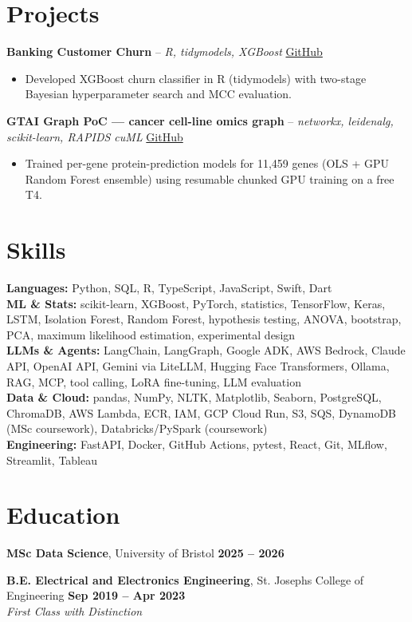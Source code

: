 \documentclass[a4paper,10pt]{article}
\begin{document}
\section{Projects}
\noindent\textbf{Banking Customer Churn} -- \textit{R, tidymodels, XGBoost} \hfill \href{https://github.com/Thiruvel-AP/Banking-Customer-Churn-Prediction}{GitHub}
\begin{itemize}
  \item Developed XGBoost churn classifier in R (tidymodels) with two-stage Bayesian hyperparameter search and MCC evaluation.
\end{itemize}
\noindent\textbf{GTAI Graph PoC — cancer cell-line omics graph} -- \textit{networkx, leidenalg, scikit-learn, RAPIDS cuML} \hfill \href{https://github.com/Thiruvel-AP/GTAI-GraphPOC}{GitHub}
\begin{itemize}
  \item Trained per-gene protein-prediction models for 11,459 genes (OLS + GPU Random Forest ensemble) using resumable chunked GPU training on a free T4.
\end{itemize}

\section{Skills}
\textbf{Languages:} Python, SQL, R, TypeScript, JavaScript, Swift, Dart\\
\textbf{ML \& Stats:} scikit-learn, XGBoost, PyTorch, statistics, TensorFlow, Keras, LSTM, Isolation Forest, Random Forest, hypothesis testing, ANOVA, bootstrap, PCA, maximum likelihood estimation, experimental design\\
\textbf{LLMs \& Agents:} LangChain, LangGraph, Google ADK, AWS Bedrock, Claude API, OpenAI API, Gemini via LiteLLM, Hugging Face Transformers, Ollama, RAG, MCP, tool calling, LoRA fine-tuning, LLM evaluation\\
\textbf{Data \& Cloud:} pandas, NumPy, NLTK, Matplotlib, Seaborn, PostgreSQL, ChromaDB, AWS Lambda, ECR, IAM, GCP Cloud Run, S3, SQS, DynamoDB (MSc coursework), Databricks/PySpark (coursework)\\
\textbf{Engineering:} FastAPI, Docker, GitHub Actions, pytest, React, Git, MLflow, Streamlit, Tableau

\section{Education}
\textbf{MSc Data Science}, University of Bristol \hfill \textbf{2025 – 2026}\par
\vspace{2pt}
\textbf{B.E. Electrical and Electronics Engineering}, St. Joseph\textquotesingle{}s College of Engineering \hfill \textbf{Sep 2019 – Apr 2023}\\ \textit{First Class with Distinction}\par
\end{document}
